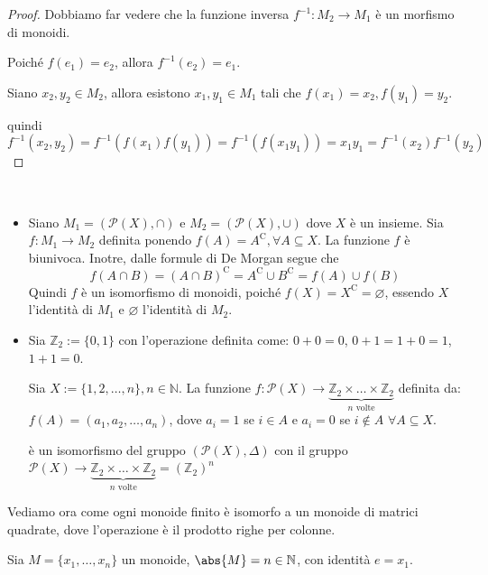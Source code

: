 \documentclass[../main.tex]{subfiles}
\begin{document}
\begin{proof}
    Dobbiamo far vedere che la funzione inversa $f^{-1} : M_2 \rightarrow M_1$ è un morfismo di monoidi.

    Poiché $f(e_1) = e_2$, allora $f^{-1}(e_2) = e_1$.

    Siano $x_2,y_2 \in M_2$, allora esistono $x_1,y_1 \in M_1$ tali che $f(x_1)= x_2 , f(y_1)=y_2$.

    quindi
    \[
        f^{-1}(x_2, y_2) = f^{-1} (f(x_1)f(y_1)) = f^{-1}(f(x_1 y_1)) = x_1 y_1 = f^{-1}(x_2) f^{-1}(y_2)
    \]
\end{proof}
\newpage %
\begin{example}
    \
    \begin{itemize}
        \item Siano $M_1 = (\mathcal{P}(X), \cap) \text{ e } M_2 = (\mathcal{P}(X), \cup)$ dove $X$ è un insieme. Sia $f : M_1 \rightarrow M_2$ definita ponendo $f(A) = A^\mathrm{C}, \forall A \subseteq X$. La funzione $f$ è biunivoca. Inotre, dalle formule di De Morgan segue che
              \[
                  f(A \cap B) = (A \cap B)^\mathrm{C} = A^\mathrm{C} \cup B^\mathrm{C} = f(A) \cup f(B)
              \]
              Quindi $f$ è un isomorfismo di monoidi, poiché $f(X) = X^\mathrm{C} = \varnothing$, essendo $X$ l'identità di $M_1$ e $\varnothing$ l'identità di $M_2$.
        \item Sia $\mathbb{Z}_2 := \{0,1\}$ con l'operazione definita come: $0+0=0$, $0+1=1+0=1$, $1+1=0$.

              Sia $X := \{1,2,\ldots,n\}, n \in \mathbb{N}$. La funzione $f: \mathcal{P}(X) \rightarrow \underbrace{\mathbb{Z}_2 \times \ldots \times \mathbb{Z}_2}_{\text{$n$ volte}}$ definita da: $f(A) = (a_1,a_2,\ldots,a_n)$, dove $a_i = 1$ se $i \in A$ e $a_i = 0$ se $i \notin A$ $\forall A \subseteq X$.

              è un isomorfismo del gruppo $(\mathcal{P}(X), \Delta)$ con il gruppo $\mathcal{P}(X) \rightarrow \underbrace{\mathbb{Z}_2 \times \ldots \times \mathbb{Z}_2}_{\text{$n$ volte}} = (\mathbb{Z}_2)^n$
    \end{itemize}
\end{example}

Vediamo ora come ogni monoide finito è isomorfo a un monoide di matrici quadrate, dove l'operazione è il prodotto righe per colonne.

Sia $M=\{x_1,\ldots,x_n\}$ un monoide, $\abs{M} = n \in \mathbb{N}$, con identità $e = x_1$.
\end{document}
